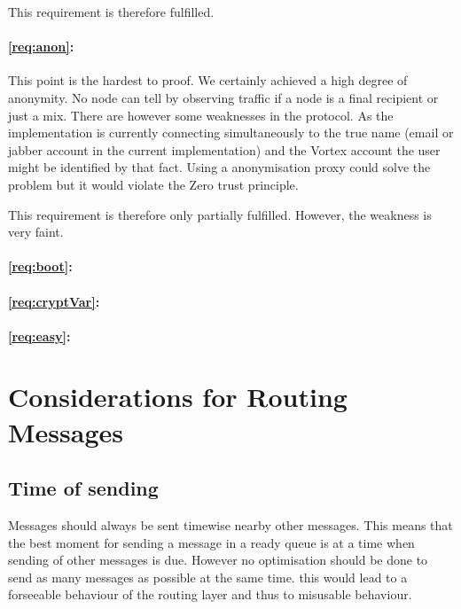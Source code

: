 This requirement is therefore fulfilled.

\paragraph*{\ref{req:anon}:} This point is the hardest to proof. We certainly achieved a high degree of anonymity. No node can tell by observing traffic if a node is a final recipient or just a mix. There are however some weaknesses in the protocol. As the implementation is currently connecting simultaneously to the true name (email or jabber account in the current implementation) and the Vortex account the user might be identified by that fact. Using a anonymisation proxy could solve the problem but it would violate the Zero trust principle.

This requirement is therefore only partially fulfilled. However, the weakness is very faint.

\paragraph*{\ref{req:boot}:} 

\paragraph*{\ref{req:cryptVar}:} 


\paragraph*{\ref{req:easy}:}


\section{Considerations for Routing Messages}
\subsection{Time of sending}
Messages should always be sent timewise nearby other messages. This means that the best moment for sending a message in a ready queue is at a time when sending of other messages is due. However no optimisation should be done to send as many messages as possible at the same time. this would lead to a forseeable behaviour of the routing layer and thus to misusable behaviour.

